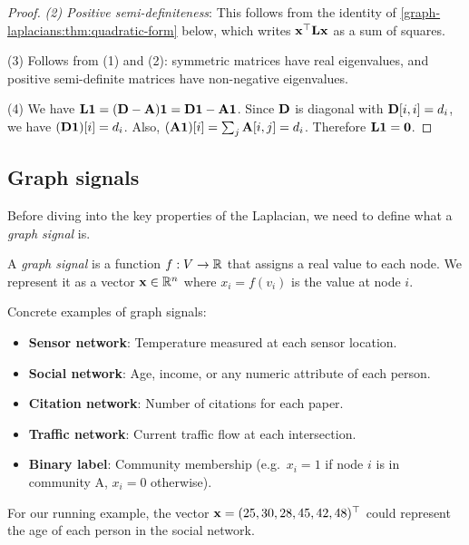 \begin{notechapter}
\begin{proof}
\emph{(2) Positive semi-definiteness}: This follows from the identity of \cref{graph-laplacians:thm:quadratic-form} below, which writes $\mathbf{x}^\top\mathbf{L}\mathbf{x}$ as a sum of squares.

(3) Follows from (1) and (2): symmetric matrices have real eigenvalues, and positive semi-definite matrices have non-negative eigenvalues.

(4) We have $\mathbf{L} \mathbf{1} = (\mathbf{D} - \mathbf{A})\mathbf{1} = \mathbf{D}\mathbf{1} - \mathbf{A}\mathbf{1}$. Since $\mathbf{D}$ is diagonal with $\mathbf{D}[i,i] = d_i$, we have $(\mathbf{D}\mathbf{1})[i] = d_i$. Also, $(\mathbf{A}\mathbf{1})[i] = \sum_j \mathbf{A}[i,j] = d_i$. Therefore $\mathbf{L}\mathbf{1} = \mathbf{0}$.
\end{proof}

\subsection{Graph signals}

Before diving into the key properties of the Laplacian, we need to define what a \emph{graph signal} is.

\begin{definition}\label{graph-laplacians:def:graph-signal}
A \emph{graph signal} is a function $f: V \to \mathbb{R}$ that assigns a real value to each node. We represent it as a vector $\mathbf{x} \in \mathbb{R}^n$ where $x_i = f(v_i)$ is the value at node $i$.
\end{definition}

\begin{example}
Concrete examples of graph signals:
\begin{itemize}
    \item \textbf{Sensor network}: Temperature measured at each sensor location.
    \item \textbf{Social network}: Age, income, or any numeric attribute of each person.
    \item \textbf{Citation network}: Number of citations for each paper.
    \item \textbf{Traffic network}: Current traffic flow at each intersection.
    \item \textbf{Binary label}: Community membership (e.g.\ $x_i = 1$ if node $i$ is in community A, $x_i = 0$ otherwise).
\end{itemize}

For our running example, the vector $\mathbf{x} = (25, 30, 28, 45, 42, 48)^\top$ could represent the age of each person in the social network.
\end{example}


\end{notechapter}
